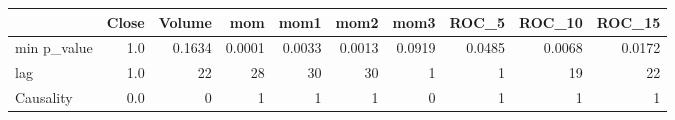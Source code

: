 {\footnotesize
\begin{tabular}{lrrrrrrrrr}
\toprule
{} &  Close &   Volume &      mom &     mom1 &     mom2 &    mom3 &   ROC\_5 &   ROC\_10 &   ROC\_15 \\
\midrule
min p\_value &    1.0 &   0.1634 &   0.0001 &   0.0033 &   0.0013 &  0.0919 &  0.0485 &   0.0068 &   0.0172 \\
lag         &    1.0 &  22 &  28 &  30 &  30 &  1 &  1 &  19 &  22 \\
Causality   &    0.0 &   0 &   1 &   1 &   1 &  0 &  1 &   1 &   1 \\
\bottomrule
\end{tabular}
}